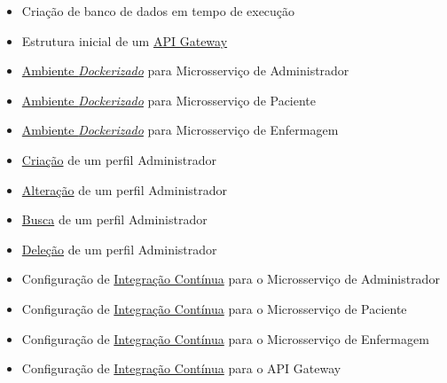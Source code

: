 \begin{apendicesenv}
\begin{itemize}
    \item Criação de banco de dados em tempo de execução
    \item Estrutura inicial de um \href{https://github.com/PillWatcher/pillwatcher-api-gateway}{API Gateway}
    \item \href{https://github.com/PillWatcher/pillwatcher-dpb-admin-service/blob/master/Dockerfile}{Ambiente \emph{Dockerizado}} para Microsserviço de Administrador
    \item \href{https://github.com/PillWatcher/pillwatcher-dpb-patient-service/blob/master/Dockerfile}{Ambiente \emph{Dockerizado}} para Microsserviço de Paciente
    \item \href{https://github.com/PillWatcher/pillwatcher-dpb-nursing-service/blob/master/Dockerfile}{Ambiente \emph{Dockerizado}} para Microsserviço de Enfermagem
    \item \href{https://github.com/PillWatcher/pillwatcher-dpb-admin-service/blob/master/src/main/java/br/com/pillwatcher/dpb/services/impl/AdminServiceImpl.java#L32}{Criação} de um perfil Administrador
    \item \href{https://github.com/PillWatcher/pillwatcher-dpb-admin-service/blob/master/src/main/java/br/com/pillwatcher/dpb/services/impl/AdminServiceImpl.java#L50}{Alteração} de um perfil Administrador
    \item \href{https://github.com/PillWatcher/pillwatcher-dpb-admin-service/blob/master/src/main/java/br/com/pillwatcher/dpb/services/impl/AdminServiceImpl.java#L79}{Busca} de um perfil Administrador
    \item \href{https://github.com/PillWatcher/pillwatcher-dpb-admin-service/blob/master/src/main/java/br/com/pillwatcher/dpb/services/impl/AdminServiceImpl.java#L96}{Deleção} de um perfil Administrador
    \item Configuração de \href{https://github.com/PillWatcher/pillwatcher-dpb-admin-service/blob/master/.travis.yml}{Integração Contínua} para o Microsserviço de Administrador
    \item Configuração de \href{https://github.com/PillWatcher/pillwatcher-dpb-patient-service/blob/master/.travis.yml}{Integração Contínua} para o Microsserviço de Paciente
    \item Configuração de \href{https://github.com/PillWatcher/pillwatcher-dpb-nursing-service/blob/master/.travis.yml}{Integração Contínua} para o Microsserviço de Enfermagem
    \item Configuração de \href{https://github.com/PillWatcher/pillwatcher-api-gateway/blob/master/.travis.yml}{Integração Contínua} para o API Gateway

\end{itemize}
\end{apendicesenv}
